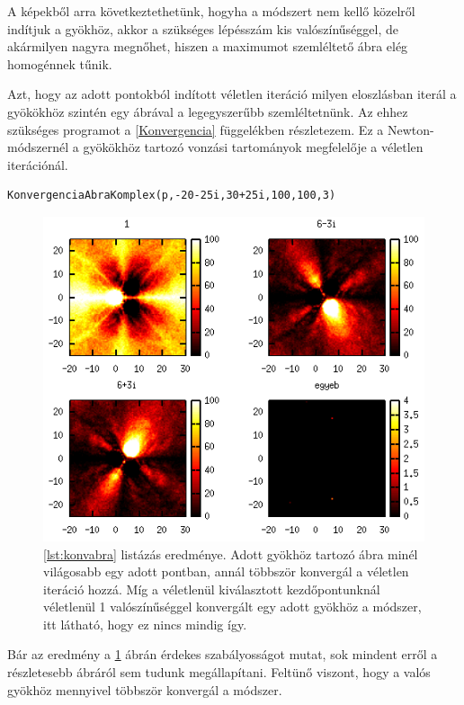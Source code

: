 \documentclass[a4paper,12pt]{report}
\begin{document}
				A képekből arra következtethetünk, hogyha a módszert nem kellő közelről indítjuk a gyökhöz, akkor a szükséges lépésszám kis valószínűséggel, de akármilyen nagyra megnőhet, hiszen a maximumot szemléltető ábra elég homogénnek tűnik.

				Azt, hogy az adott pontokból indított véletlen iteráció milyen eloszlásban iterál a gyökökhöz szintén egy ábrával a legegyszerűbb szemléltetnünk. Az ehhez szükséges programot a \ref{Konvergencia} függelékben részletezem. Ez a Newton-módszernél a gyökökhöz tartozó vonzási tartományok megfelelője a véletlen iterációnál.
				\begin{lstlisting}[caption=Bemenet,label=lst:konvabra]
KonvergenciaAbraKomplex(p,-20-25i,30+25i,100,100,3)
				\end{lstlisting}
				
				\begin{figure}[ht]
					\centering
					\includegraphics[scale=0.65]{Konv2.png}
					\caption{\ref{lst:konvabra} listázás eredménye. Adott gyökhöz tartozó ábra minél világosabb egy adott pontban, annál többször konvergál a véletlen iteráció hozzá. Míg a véletlenül kiválasztott kezdőpontunknál véletlenül 1 valószínűséggel konvergált egy adott gyökhöz a módszer, itt látható, hogy ez nincs mindig így.} \label{fig:konv_el}
				\end{figure}
				
				Bár az eredmény a \ref{fig:konv_el} ábrán érdekes szabályosságot mutat, sok mindent erről a részletesebb ábráról sem tudunk megállapítani. Feltünő viszont, hogy a valós gyökhöz mennyivel többször konvergál a módszer.
				
\end{document}
